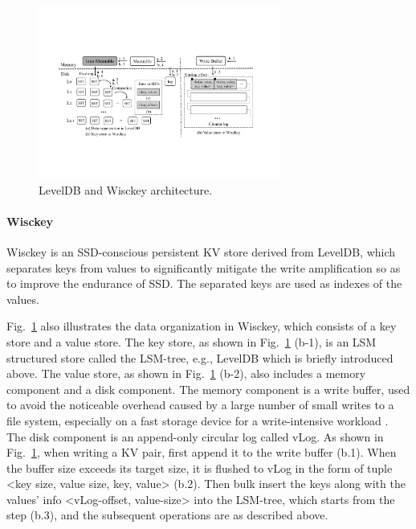 \documentclass[sigconf]{acmart}
\begin{document}

\begin{figure}[!t]
	\setlength{\abovecaptionskip}{0.cm}	
	\setlength{\belowcaptionskip}{-0.cm}
	\centerline{\includegraphics[width=80mm]{lsm_wisckey.pdf}}
	\caption{LevelDB and Wisckey architecture.}
	\label{fig::lsm_wisckey}
\end{figure}

\paragraph{Wisckey} Wisckey is an SSD-conscious persistent KV store derived from LevelDB, which separates keys from values to significantly mitigate the write amplification so as to improve the endurance of SSD. The separated keys are used as indexes of the values. 

Fig.~\ref{fig::lsm_wisckey} also illustrates the data organization in Wisckey, which consists of a key store and a value store. The key store, as shown in Fig.~\ref{fig::lsm_wisckey} (b-1), is an LSM structured store called the LSM-tree, e.g., LevelDB which is briefly introduced above. The value store, as shown in Fig.~\ref{fig::lsm_wisckey} (b-2), also includes a memory component and a disk component. The memory component is a write buffer, used to avoid the noticeable overhead caused by a large number of small writes to a file system, especially on a fast storage device for a write-intensive workload \cite{Arrakis, Wisckey}. The disk component is an append-only circular log called vLog. As shown in Fig.~\ref{fig::lsm_wisckey}, when writing a KV pair, first append it to the write buffer (b.1). When the buffer size exceeds its target size, it is flushed to vLog in the form of tuple \textless key size, value size, key, value\textgreater{} (b.2). Then bulk insert the keys along with the values’ info \textless vLog-offset, value-size\textgreater{} into the LSM-tree, which starts from the step (b.3), and the subsequent operations are as described above.
\end{document}
